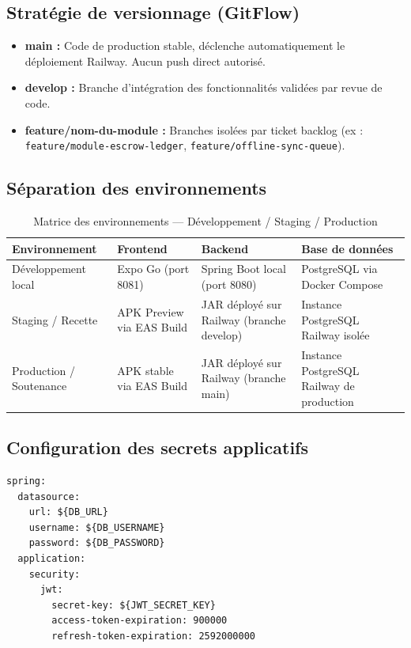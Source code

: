 \documentclass[12pt,a4paper]{report}
\begin{document}
\subsection{Stratégie de versionnage (GitFlow)}

\begin{itemize}
  \item \textbf{main :} Code de production stable, déclenche automatiquement le déploiement Railway. Aucun push direct autorisé.
  \item \textbf{develop :} Branche d'intégration des fonctionnalités validées par revue de code.
  \item \textbf{feature/nom-du-module :} Branches isolées par ticket backlog (ex : \texttt{feature/module-escrow-ledger}, \texttt{feature/offline-sync-queue}).
\end{itemize}

\subsection{Séparation des environnements}

\begin{table}[H]
\centering
\caption{Matrice des environnements — Développement / Staging / Production}
\begin{tabularx}{\textwidth}{L{3cm} L{4.5cm} L{4.5cm} X}
\toprule
\textbf{Environnement} & \textbf{Frontend} & \textbf{Backend} & \textbf{Base de données} \\
\midrule
Développement local & Expo Go (port 8081) & Spring Boot local (port 8080) & PostgreSQL via Docker Compose \\
Staging / Recette & APK Preview via EAS Build & JAR déployé sur Railway (branche develop) & Instance PostgreSQL Railway isolée \\
Production / Soutenance & APK stable via EAS Build & JAR déployé sur Railway (branche main) & Instance PostgreSQL Railway de production \\
\bottomrule
\end{tabularx}
\end{table}

\subsection{Configuration des secrets applicatifs}

\begin{lstlisting}[language={}, caption={Backend Spring Boot — variables d'environnement Railway}]
spring:
  datasource:
    url: ${DB_URL}
    username: ${DB_USERNAME}
    password: ${DB_PASSWORD}
  application:
    security:
      jwt:
        secret-key: ${JWT_SECRET_KEY}
        access-token-expiration: 900000
        refresh-token-expiration: 2592000000
\end{lstlisting}
\end{document}
